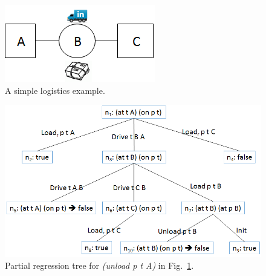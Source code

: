 \documentclass[letterpaper]{article}
\theoremstyle{definition}
\begin{document}



\begin{figure}
\centering
\includegraphics[scale=0.7]{SmallLogistics}
\caption{A simple logistics example.}
\label{fig:small}
\end{figure}


\begin{figure}
\centering
\includegraphics[width=\columnwidth]{RegressionTree}
\caption{Partial regression tree for {\em (unload p t A)} in Fig.~\ref{fig:small}.}
\label{fig:tree}
\end{figure}
\end{document}
